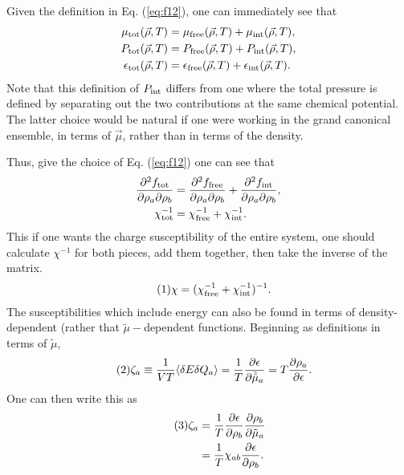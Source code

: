\documentclass[12pt]{article}
\numberwithin{equation}{section}
\numberwithin{figure}{section}
\newcommand\eqnumber{\addtocounter{equation}{1}\tag{\theequation}}
\begin{document}
Given the definition in Eq. (\ref{eq:f12}), one can immediately see that
\begin{align*}
\mu_{\rm tot}(\vec{\rho},T)&=\mu_{\rm free}(\vec{\rho},T)+\mu_{\rm int}(\vec{\rho},T),\\
P_{\rm tot}(\vec{\rho},T)&=P_{\rm free}(\vec{\rho},T)+P_{\rm int}(\vec{\rho},T),\\
\epsilon_{\rm tot}(\vec{\rho},T)&=\epsilon_{\rm free}(\vec{\rho},T)+\epsilon_{\rm int}(\vec{\rho},T).
\end{align*}
Note that this definition of $P_{\rm int}$ differs from one where the total pressure is defined by separating out the two contributions at the same chemical potential. The latter choice would be natural if one were working in the grand canonical ensemble, in terms of $\vec{\mu}$, rather than in terms of the density.

Thus, give the choice of Eq. (\ref{eq:f12}) one can see that
\begin{align*}
\frac{\partial^2f_{\rm tot}}{\partial\rho_a\partial\rho_b}&=
\frac{\partial^2f_{\rm free}}{\partial\rho_a\partial\rho_b}+\frac{\partial^2f_{\rm int}}{\partial\rho_a\partial\rho_b},\\
\chi^{-1}_{\rm tot}&=\chi^{-1}_{\rm free}+\chi^{-1}_{\rm int}.
\end{align*}
This if one wants the charge susceptibility of the entire system, one should calculate $\chi^{-1}$ for both pieces, add them together, then take the inverse of the matrix.
\begin{align*}\eqnumber
\chi&=(\chi^{-1}_{\rm free}+\chi^{-1}_{\rm int})^{-1}.
\end{align*}
The susceptibilities which include energy can also be found in terms of density-dependent (rather that $\tilde{\mu}-$dependent functions. Beginning as definitions in terms of $\tilde{\mu}$,
\begin{align*}\eqnumber
\zeta_a&\equiv\frac{1}{VT}\langle\delta E\delta Q_a\rangle=\frac{1}{T}\frac{\partial\epsilon}{\partial\tilde{\tilde{\mu}}_a}
=T\frac{\partial\rho_a}{\partial\epsilon}.
\end{align*}
One can then write this as
\begin{align*}\eqnumber
\zeta_a&=\frac{1}{T}\frac{\partial\epsilon}{\partial\rho_b}\frac{\partial\rho_b}{\partial\tilde{\mu}_a}\\
&=\frac{1}{T}\chi_{ab}\frac{\partial\epsilon}{\partial\rho_b}.
\end{align*}
\end{document}
